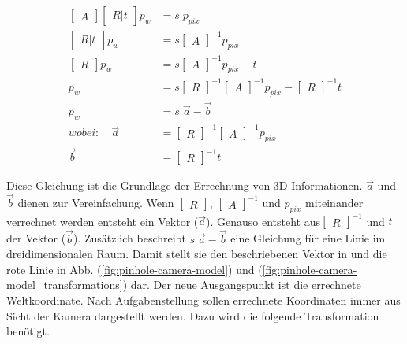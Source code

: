 	\begin{equation}
	\begin{aligned}
	\begin{bmatrix} A \end{bmatrix} \begin{bmatrix} R|t \end{bmatrix} p_w &= s \; p_{pix} \\
	\begin{bmatrix} R|t \end{bmatrix} p_w &= s \begin{bmatrix} A \end{bmatrix}^{-1} p_{pix} \\
	\begin{bmatrix} R \end{bmatrix} p_w &= s \begin{bmatrix} A \end{bmatrix}^{-1} p_{pix} - t \\
	p_w &= s \begin{bmatrix} R \end{bmatrix}^{-1} \begin{bmatrix} A \end{bmatrix}^{-1} p_{pix} - \begin{bmatrix} R \end{bmatrix}^{-1} t \\
	p_w &= s \; \vec{a} - \vec{b} \\
	wobei: \quad \vec{a} & = \begin{bmatrix} R \end{bmatrix}^{-1} \begin{bmatrix} A \end{bmatrix}^{-1} p_{pix} \\
	\vec{b} &= \begin{bmatrix} R \end{bmatrix}^{-1} t
	\end{aligned}
	\label{eq:pixel_zu_welt}
	\end{equation}
	
	Diese Gleichung ist die Grundlage der Errechnung von 3D-Informationen. \( \vec{a} \) und \( \vec{b} \) dienen zur Vereinfachung. Wenn \( \begin{bmatrix} R \end{bmatrix} \), \( \begin{bmatrix} A \end{bmatrix}^{-1} \) und \( p_{pix} \) miteinander verrechnet werden entsteht ein Vektor (\( \vec{a} \)). Genauso entsteht aus\( \begin{bmatrix} R \end{bmatrix}^{-1} \) und \( t \) der Vektor (\( \vec{b} \)). Zusätzlich beschreibt \( s \; \vec{a} - \vec{b} \) eine Gleichung für eine Linie im dreidimensionalen Raum. Damit stellt sie den beschriebenen Vektor in \citep[vgl.][S. 3]{dawson-howe_simple_1994} und die rote Linie in Abb. (\ref{fig:pinhole-camera-model}) und (\ref{fig:pinhole-camera-model_transformations}) dar. \newline
	Der neue Ausgangspunkt ist die errechnete Weltkoordinate. Nach Aufgabenstellung sollen errechnete Koordinaten immer aus Sicht der Kamera dargestellt werden. Dazu wird die folgende Transformation benötigt. 
	
